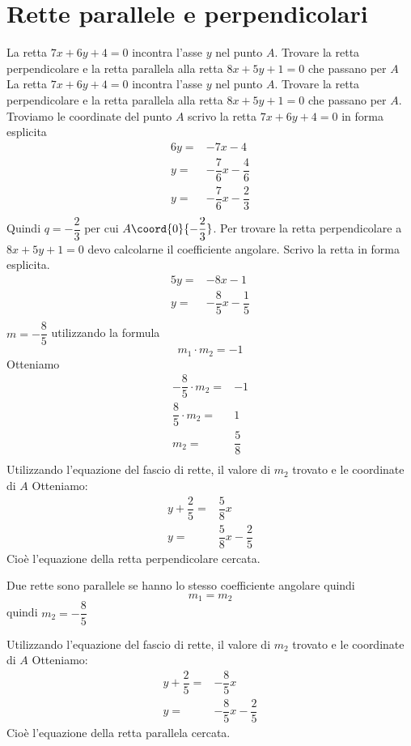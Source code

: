 \section{Rette parallele e perpendicolari}
\begin{exercise}
	La retta $7x+6y+4=0$ incontra l'asse $y$ nel punto $A$. Trovare la retta perpendicolare e la retta parallela alla retta $8x+5y+1=0$ che passano per $A$
	\tcblower
	La retta $7x+6y+4=0$ incontra l'asse $y$ nel punto $A$. Trovare la retta perpendicolare e la retta parallela alla retta $8x+5y+1=0$ che passano per $A$.
	Troviamo le coordinate del punto $A$ scrivo la retta  $7x+6y+4=0$ in forma esplicita
	\begin{align*}
		6y=&-7x-4\\
		y=&-\dfrac{7}{6}x-\dfrac{4}{6}\\
		y=&-\dfrac{7}{6}x-\dfrac{2}{3}\\
	\end{align*}
	Quindi $q=-\dfrac{2}{3}$ per cui $A\coord{0}{-\dfrac{2}{3}}$. Per trovare la retta perpendicolare a $8x+5y+1=0$ devo calcolarne il coefficiente angolare.
	Scrivo la retta in forma esplicita.
	\begin{align*}
		5y=&-8x-1\\
		y=&-\dfrac{8}{5}x-\dfrac{1}{5}\\
	\end{align*}
	$m=-\dfrac{8}{5}$ utilizzando la formula \[m_1\cdot m_2=-1\] Otteniamo
	\begin{align*}
		-\dfrac{8}{5}\cdot m_2=&-1\\
		\dfrac{8}{5}\cdot m_2=&1\\
		m_2=&\dfrac{5}{8}\\
	\end{align*}
	Utilizzando l'equazione del fascio di rette, il valore di $m_2$ trovato e le coordinate di $A$ Otteniamo:
	\begin{align*}
		y+\dfrac{2}{5}=&\dfrac{5}{8}x\\
		y=&\dfrac{5}{8}x-\dfrac{2}{5}
	\end{align*}
	Cioè l'equazione della retta perpendicolare cercata.
	
	Due rette sono parallele se hanno lo stesso coefficiente angolare quindi \[m_1=m_2 \]
	quindi $m_2=-\dfrac{8}{5}$ 
	
	Utilizzando l'equazione del fascio di rette, il valore di $m_2$ trovato e le coordinate di $A$ Otteniamo:
	\begin{align*}
		y+\dfrac{2}{5}=&-\dfrac{8}{5}x\\
		y=&-\dfrac{8}{5}x-\dfrac{2}{5}
	\end{align*}
	Cioè l'equazione della retta parallela cercata.		
	\begin{center}
		
	\end{center}
\end{exercise}
